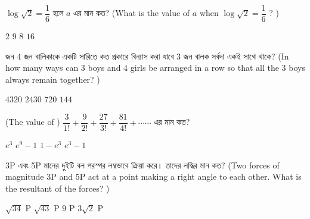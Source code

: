\documentclass[addpoints]{exam}
\begin{document}
\begin{questions}
\question  $ \log \sqrt{2} = \dfrac{1}{6} $ হলে $ a $ এর মান কত? (What is the value of $ a $ when $ \log \sqrt{2} = \dfrac{1}{6} $ ? )


\begin{oneparchoices}
\choice  $ 2 $
\choice  $ 9 $
\choice  $ 8 $
\choice  $ 16 $
\end{oneparchoices}

 জন 4 জন বালিকাকে একটি সারিতে কত প্রকারে বিন্যাস করা যাবে 3 জন বালক সর্বদা একই সাথে থাকে? (In how many ways can 3 boys and 4 girls be arranged in a row so that all the 3 boys always remain together? )

\begin{oneparchoices}
\choice $ 4320 $
\choice $ 2430 $
\choice $ 720 $
\choice  $ 144 $
\end{oneparchoices}

 \question (The value of ) $ \dfrac{3}{1!}+\dfrac{9}{2!}+\dfrac{27}{3!}+\dfrac{81}{4!}+ \cdots \cdots $ এর মান কত?

\begin{oneparchoices}
\choice $ e^{3} $
\choice $ e^{9}-1 $
\choice $ 1-e^{3} $
\choice $ e^{3}-1 $
\end{oneparchoices}

\question  3P এবং 5P  মানের দুইটি বল পরস্পর লম্বভাবে ক্রিয়া করে। তাদের লদ্ধির মান কত? (Two forces of magnitude 3P and 5P act at a point making a right angle to each other. What is the resultant of the forces? )

\begin{oneparchoices}
\choice  $ \sqrt{34} $ P
\choice  $ \sqrt{43} $ P
\choice  $ 9 $ P
\choice  $ 3\sqrt{2} $ P
\end{oneparchoices}

\end{questions}
\end{document}
